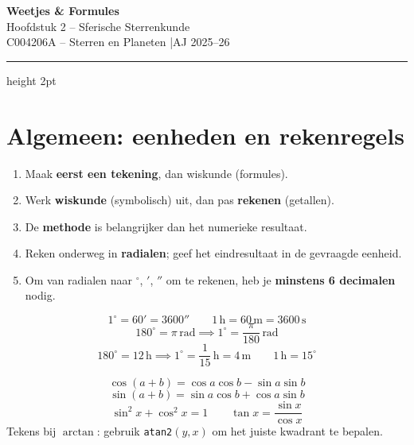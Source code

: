 \documentclass[11pt, a4paper]{article}
\newcommand{\graden}{^{\circ}}
\newcommand{\boogmin}{'}
\newcommand{\boogsec}{''}
\begin{document}

\begin{center}
  {\LARGE\bfseries\color{blauw} Weetjes \& Formules}\\[4pt]
  {\large Hoofdstuk 2 – Sferische Sterrenkunde}\\[2pt]
  {\normalsize C004206A – Sterren en Planeten \quad|\quad AJ 2025--26}
\end{center}
\vspace{0.3cm}
\hrule height 2pt \vspace{0.5cm}

\tableofcontents

\newpage

\section{Algemeen: eenheden en rekenregels}

\begin{weetje}[Werkmethode]
\begin{enumerate}[leftmargin=1.5em]
  \item Maak \textbf{eerst een tekening}, dan wiskunde (formules).
  \item Werk \textbf{wiskunde} (symbolisch) uit, dan pas \textbf{rekenen} (getallen).
  \item De \textbf{methode} is belangrijker dan het numerieke resultaat.
  \item Reken onderweg in \textbf{radialen}; geef het eindresultaat in de gevraagde eenheid.
  \item Om van radialen naar $\graden$, $\boogmin$, $\boogsec$ om te rekenen, heb je \textbf{minstens 6 decimalen} nodig.
\end{enumerate}
\end{weetje}

\begin{formule}[Eenheidsomrekeningen]
\[
  1\graden = 60\boogmin = 3600\boogsec \qquad
  1\,\mathrm{h} = 60\,\mathrm{m} = 3600\,\mathrm{s}
\]
\[
  180\graden = \pi\,\text{rad} \implies 1\graden = \frac{\pi}{180}\,\text{rad}
\]
\[
  180\graden = 12\,\mathrm{h} \implies 1\graden = \frac{1}{15}\,\mathrm{h} = 4\,\mathrm{m}
  \qquad 1\,\mathrm{h} = 15\graden
\]
\end{formule}

\begin{tip}
\[
  \cos(a+b) = \cos a\cos b - \sin a\sin b
\]
\[
  \sin(a+b) = \sin a\cos b + \cos a\sin b 
\]
\[
  \sin^2 x + \cos^2 x = 1 \qquad \tan x = \frac{\sin x}{\cos x}
\]
Tekens bij $\arctan$: gebruik \texttt{atan2}$(y,x)$ om het juiste kwadrant te bepalen.
\end{tip}
\end{document}
